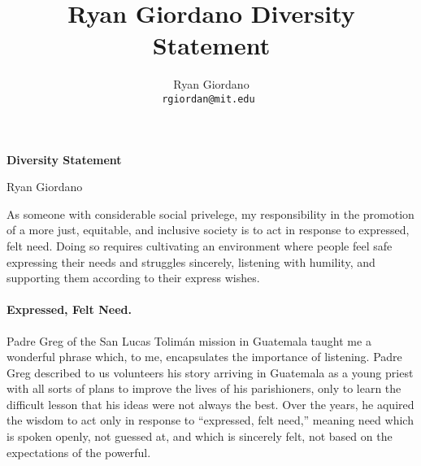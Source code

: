 
\usepackage{enumitem}

\usepackage{geometry}
\geometry{top=0.7in}
\geometry{left=1.3in}
\geometry{right=1.3in}


\title{Ryan Giordano Diversity Statement}

\author{
  Ryan Giordano \\ \texttt{rgiordan@mit.edu }
}



\begin{minipage}[t]{0.5\textwidth}
\hspace{-2em} %
{\bf \LARGE Diversity Statement}\\
\end{minipage}
\begin{minipage}[t]{0.5\textwidth}
        \hspace{8em} %
        {\LARGE Ryan Giordano}
\end{minipage}






As someone with considerable social privelege, my responsibility in the
promotion of a more just, equitable, and inclusive society is to act in response
to expressed, felt need.  Doing so requires cultivating an environment where
people feel safe expressing their needs and struggles sincerely, listening with
humility, and supporting them according to their express wishes.


\paragraph{Expressed, Felt Need.}
%
Padre Greg of the San Lucas Tolimán mission in Guatemala taught me a wonderful
phrase which, to me, encapsulates the importance of listening.  Padre Greg
described to us volunteers his story arriving in Guatemala as a young priest
with all sorts of plans to improve the lives of his parishioners, only to learn
the difficult lesson that his ideas were not always the best. Over the years, he
aquired the wisdom to act only in response to ``expressed, felt need,'' meaning
need which is spoken openly, not guessed at, and which is sincerely felt, not
based on the expectations of the powerful.

